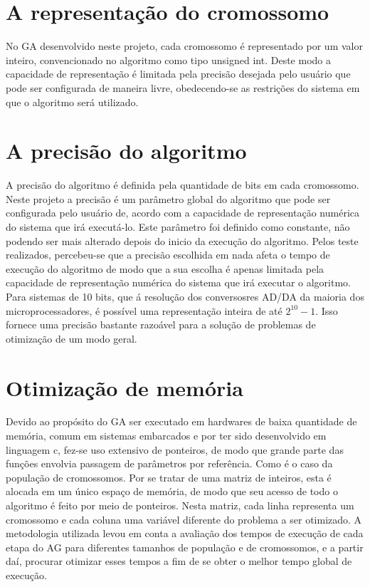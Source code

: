 \documentclass[
    12pt,               %
    oneside,%
    a4paper,            %
    english,            %
    french,             %
    spanish,            %
    brazil,             %
    ]{abntex2}
\begin{document}
\section{A representação do cromossomo}

  No GA desenvolvido neste projeto, cada cromossomo é representado por um valor inteiro, convencionado no algoritmo como tipo unsigned int. Deste modo a capacidade de representação é limitada pela precisão desejada pelo usuário que pode ser configurada de maneira livre, obedecendo-se as restrições do sistema em que o algoritmo será utilizado.

\section{A precisão do algoritmo}

  A precisão do algoritmo é definida pela quantidade de bits em cada cromossomo. Neste projeto a precisão é um parâmetro global do algoritmo que pode ser configurada pelo usuário de, acordo com a capacidade de representação numérica do sistema que irá executá-lo. Este parâmetro foi definido como constante, não podendo ser mais alterado depois do inicio da execução do algoritmo. Pelos teste realizados, percebeu-se que a precisão escolhida em nada afeta o tempo de execução do algoritmo de modo que a sua escolha é apenas limitada pela capacidade de representação numérica do sistema que irá executar o algoritmo.
  Para sistemas de 10 bits, que á resolução dos conversosres AD/DA da maioria dos microprocessadores, é possível uma representação inteira de até   $2^10 -1$. Isso fornece uma precisão bastante razoável para a solução de problemas de otimização de um modo geral.

\section{Otimização de memória}

  Devido ao propósito do GA ser executado em hardwares de baixa quantidade de memória, comum em sistemas embarcados e por ter sido desenvolvido em linguagem c, fez-se uso extensivo de ponteiros, de modo que grande parte das funções envolvia passagem de parâmetros por referência. Como é o caso da população de cromossomos. Por se tratar de uma matriz de inteiros, esta é alocada em um único espaço de memória, de modo que seu acesso de todo o algoritmo é feito por meio de ponteiros. Nesta matriz, cada linha representa um cromossomo e cada coluna uma variável diferente do problema a ser otimizado.
  A metodologia utilizada levou em conta a avaliação dos tempos de execução de cada etapa do AG para diferentes tamanhos de população e de cromossomos, e a partir daí, procurar otimizar esses tempos a fim de se obter o melhor tempo global de execução.
\end{document}
